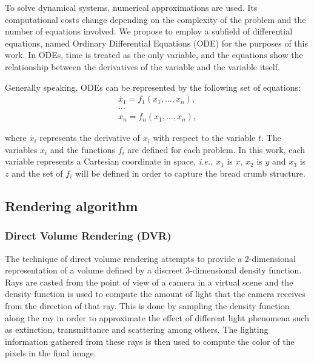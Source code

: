 \documentclass[oneside,a4paper,english,links]{amca}
\begin{document}
To solve dynamical systems, numerical approximations are used. Its computational costs change depending on the complexity of the problem and the number of equations involved. We propose to employ a subfield of differential equations, named Ordinary Differential Equations (ODE) for the purposes of this work. In ODEs, time is treated as the only variable, and the equations show the relationship between the derivatives of the variable and the variable itself. 

Generally speaking, ODEs can be represented by the following set of equations:
\begin{equation} \label{eq:simple}  
\begin{aligned}
\dot{x_{1}} = f_{1}(x_{1},\ldots,x_{n}),\\
\ldots\\
\dot{x_{n}} = f_{n}(x_{1},\ldots,x_{n}),
\end{aligned}
\end{equation}

where $\dot{x_{i}}$ represents the derivative of $x_{i}$ with respect to the variable $t$. The variables $x_{i}$ and the functions $f_{i}$ are defined for each problem. In this work, each variable represents a Cartesian coordinate in space, {\em i.e.,} $x_{1}$ is $x$, $x_{2}$ is $y$ and $x_{3}$ is $z$ and the set of $f_{i}$ will be defined in order to capture the bread crumb structure.


\subsection{Rendering algorithm}

\subsubsection{Direct Volume Rendering (DVR)}

The technique of direct volume rendering attempts to provide a
2-dimensional representation of a volume defined by a discreet
3-dimensional density function. Rays are casted from the point of view
of a camera in a virtual scene and the density function is used to
compute the amount of light that the camera receives from the
direction of that ray. This is done by sampling the density function
along the ray in order to approximate the effect of different light
phenomena such as extinction, transmittance and scattering among
others. The lighting information gathered from these rays is then
used to compute the color of the pixels in the final image.
\end{document}
